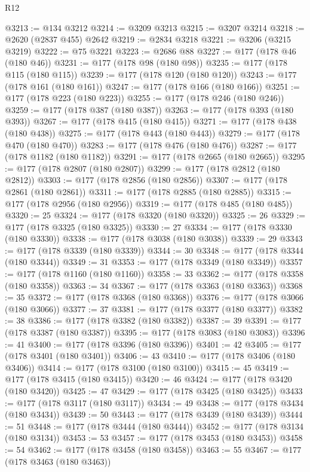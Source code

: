 \begin{lexlean}{R12}
\begin{coremodule}
@3213 := @134 @3212
@3214 := @3209 @3213
@3215 := @3207 @3214
@3218 := @2620 (@2837 @455) @2642
@3219 := @2834 @3218
@3221 := @3206 (@3215 @3219)
@3222 := @75 @3221
@3223 := @2686 @88
@3227 := @177 (@178 @46 (@180 @46))
@3231 := @177 (@178 @98 (@180 @98))
@3235 := @177 (@178 @115 (@180 @115))
@3239 := @177 (@178 @120 (@180 @120))
@3243 := @177 (@178 @161 (@180 @161))
@3247 := @177 (@178 @166 (@180 @166))
@3251 := @177 (@178 @223 (@180 @223))
@3255 := @177 (@178 @246 (@180 @246))
@3259 := @177 (@178 @387 (@180 @387))
@3263 := @177 (@178 @393 (@180 @393))
@3267 := @177 (@178 @415 (@180 @415))
@3271 := @177 (@178 @438 (@180 @438))
@3275 := @177 (@178 @443 (@180 @443))
@3279 := @177 (@178 @470 (@180 @470))
@3283 := @177 (@178 @476 (@180 @476))
@3287 := @177 (@178 @1182 (@180 @1182))
@3291 := @177 (@178 @2665 (@180 @2665))
@3295 := @177 (@178 @2807 (@180 @2807))
@3299 := @177 (@178 @2812 (@180 @2812))
@3303 := @177 (@178 @2856 (@180 @2856))
@3307 := @177 (@178 @2861 (@180 @2861))
@3311 := @177 (@178 @2885 (@180 @2885))
@3315 := @177 (@178 @2956 (@180 @2956))
@3319 := @177 (@178 @485 (@180 @485))
@3320 := 25
@3324 := @177 (@178 @3320 (@180 @3320))
@3325 := 26
@3329 := @177 (@178 @3325 (@180 @3325))
@3330 := 27
@3334 := @177 (@178 @3330 (@180 @3330))
@3338 := @177 (@178 @3038 (@180 @3038))
@3339 := 29
@3343 := @177 (@178 @3339 (@180 @3339))
@3344 := 30
@3348 := @177 (@178 @3344 (@180 @3344))
@3349 := 31
@3353 := @177 (@178 @3349 (@180 @3349))
@3357 := @177 (@178 @1160 (@180 @1160))
@3358 := 33
@3362 := @177 (@178 @3358 (@180 @3358))
@3363 := 34
@3367 := @177 (@178 @3363 (@180 @3363))
@3368 := 35
@3372 := @177 (@178 @3368 (@180 @3368))
@3376 := @177 (@178 @3066 (@180 @3066))
@3377 := 37
@3381 := @177 (@178 @3377 (@180 @3377))
@3382 := 38
@3386 := @177 (@178 @3382 (@180 @3382))
@3387 := 39
@3391 := @177 (@178 @3387 (@180 @3387))
@3395 := @177 (@178 @3083 (@180 @3083))
@3396 := 41
@3400 := @177 (@178 @3396 (@180 @3396))
@3401 := 42
@3405 := @177 (@178 @3401 (@180 @3401))
@3406 := 43
@3410 := @177 (@178 @3406 (@180 @3406))
@3414 := @177 (@178 @3100 (@180 @3100))
@3415 := 45
@3419 := @177 (@178 @3415 (@180 @3415))
@3420 := 46
@3424 := @177 (@178 @3420 (@180 @3420))
@3425 := 47
@3429 := @177 (@178 @3425 (@180 @3425))
@3433 := @177 (@178 @3117 (@180 @3117))
@3434 := 49
@3438 := @177 (@178 @3434 (@180 @3434))
@3439 := 50
@3443 := @177 (@178 @3439 (@180 @3439))
@3444 := 51
@3448 := @177 (@178 @3444 (@180 @3444))
@3452 := @177 (@178 @3134 (@180 @3134))
@3453 := 53
@3457 := @177 (@178 @3453 (@180 @3453))
@3458 := 54
@3462 := @177 (@178 @3458 (@180 @3458))
@3463 := 55
@3467 := @177 (@178 @3463 (@180 @3463))

\end{coremodule}
\end{lexlean}

